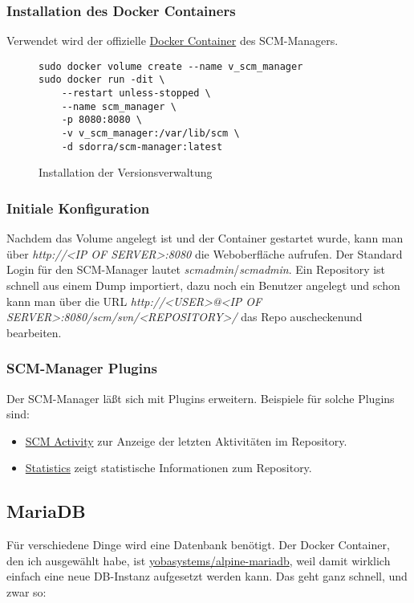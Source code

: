 \documentclass[12pt,a4paper]{article}
\newcommand{\code}[1]{\textit{#1}}
\begin{document}
\subsubsection{Installation des Docker Containers}
Verwendet wird der offizielle \href{https://hub.docker.com/r/sdorra/scm-manager}{Docker Container} des SCM-Managers.

\begin{figure}[H]
\begin{lstlisting}
sudo docker volume create --name v_scm_manager
sudo docker run -dit \
    --restart unless-stopped \
    --name scm_manager \
    -p 8080:8080 \
    -v v_scm_manager:/var/lib/scm \
    -d sdorra/scm-manager:latest
\end{lstlisting}
\caption{Installation der Versionsverwaltung}\label{fig:Installation der Versionsverwaltung}
\end{figure}

\subsubsection{Initiale Konfiguration}
Nachdem das Volume angelegt ist und der Container gestartet wurde, kann man über \code{http://<IP OF SERVER>:8080} die
Weboberfläche aufrufen. Der Standard Login für den SCM-Manager lautet \code{scmadmin}/\code{scmadmin}. Ein Repository
ist schnell aus einem Dump importiert, dazu noch ein Benutzer angelegt und schon kann man über die URL\linebreak
\code{http://<USER>@<IP OF SERVER>:8080/scm/svn/<REPOSITORY>/} das Repo auschecken\linebreak und bearbeiten.

\subsubsection{SCM-Manager Plugins}
Der SCM-Manager läßt sich mit Plugins erweitern. Beispiele für solche Plugins sind:

\begin{itemize}
\item \href{https://bitbucket.org/sdorra/scm-activity-plugin/src/default/}{SCM Activity} zur Anzeige der letzten Aktivitäten im Repository.
\item \href{https://bitbucket.org/sdorra/scm-statistic-plugin/src/default/}{Statistics} zeigt statistische Informationen zum Repository.
\end{itemize}

\subsection{MariaDB}\label{sub:MariaDB}
Für verschiedene Dinge wird eine Datenbank benötigt. Der Docker Container, den ich ausgewählt habe, ist
\href{https://hub.docker.com/r/yobasystems/alpine-mariadb}{yobasystems/alpine-mariadb}, weil damit wirklich einfach eine
neue DB-Instanz aufgesetzt werden kann. Das geht ganz schnell, und zwar so:
\end{document}
